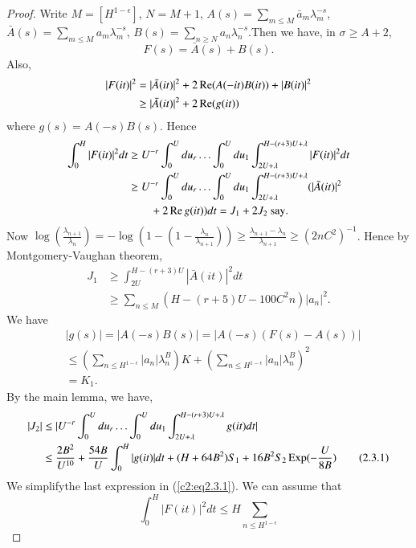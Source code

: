 \begin{proof}
Write $M = [H^{1-\epsilon}]$, $N = M + 1$, $A(s) = \sum\limits_{m\leq M} \bar{a}_m \lambda^{-s}_m$, $\bar{A} (s) = \sum\limits_{m \leq M} a_m \lambda^{-s}_m$, $B(s) = \sum\limits_{n \geq N} a_n \lambda^{-s}_n$.\pageoriginale Then we have, in $\sigma \geq A +2$,
$$
F(s) = \bar{A} (s) + B(s).
$$
Also,
\begin{align*}
|F(it)|^2 & = |\bar{A}(it)|^2 + 2 \operatorname{Re} (A (-it) B (it)) + |B(it)|^2\\
& \geq |\bar{A}(it)|^2 + 2 \operatorname{Re} (g (it))
\end{align*}
where $g(s) = A(-s) B(s)$. Hence
\begin{align*}
\int^H_0 |F(it)|^2 dt & \geq U^{-r} \int^U_0 du_r \ldots \int^U_0 du_1 \int^{H-(r+3)U+\lambda}_{2U+\lambda} |F(it)|^2 dt\\
& \geq U^{-r} \int^U_0 du_r \ldots \int^U_0 du_1 \int^{H-(r+3)
  U+\lambda}_{2U + \lambda} (|\bar{A} (it)|^2\\ 
&\qquad {} + 2 \operatorname{Re} g(it) ) dt 
 = J_1 + 2 J_2 \text{ say}.
\end{align*}
Now $\log \left(\frac{\lambda_{n+1}}{\lambda_n} \right) = - \log \left( 1-\left(1 - \frac{\lambda_n}{\lambda_{n+1}} \right)\right) \geq \frac{\lambda_{n+1} - \lambda_n}{\lambda_{n+1}} \geq (2nC^2)^{-1}$. Hence by Montgomery-Vaughan theorem,
\begin{align*}
J_1 & \geq \int^{H-(r+3)U}_{2U} |\bar{A} (it)|^2 dt\\
& \geq \sum\limits_{n\leq M} (H -(r+5)U-100C^2 n) |a_n|^2.
\end{align*}
We have
\begin{align*}
& |g(s)| = |A(-s) B(s)| = |A(-s) (F(s) -A(s))|\\
& \leq \left(\sum\limits_{n\leq H^{1-\epsilon}} |a_n|\lambda^B_n \right) K + \left(\sum\limits_{n \leq H^{1-\epsilon}} |a_n| \lambda^B_n\right)^2\\
& = K_1.
\end{align*} 
By the main lemma, we have,
\begin{align*}
|J_2| & \leq |U^{-r} \int^U_0 du_r \ldots \int^U_0 du_1 \int^{H-(r+3) U+\lambda}_{2U+\lambda} g(it) dt|\\
& \leq \frac{2B^2}{U^{10}} + \frac{54B}{U} \int^H_0 |g(it)| dt + (H + 64 B^2)S_1 + 16 B^2 S_2 \operatorname{Exp} (-\frac{U}{8B}) \tag{2.3.1}\label{c2:eq2.3.1}
\end{align*}
We simplify\pageoriginale the last expression in
(\ref{c2:eq2.3.1}). We can assume that 
$$\int^H_0 |F(it)|^2 dt \leq H \sum\limits_{n\leq H^{1-\epsilon}}
$$
\end{proof}
